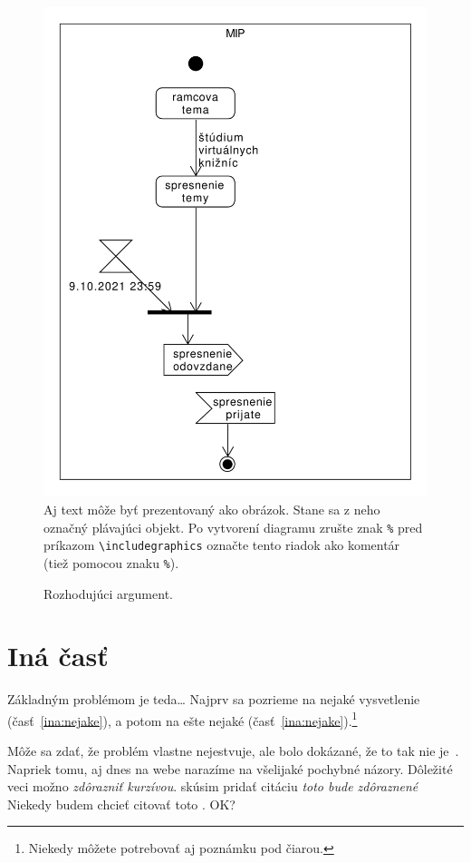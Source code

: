 \documentclass[10pt,twoside,slovak,a4paper]{article}
\begin{document}
\begin{figure}[tbh]
\centering
\includegraphics[scale=1.0]{diagram.pdf}
Aj text môže byť prezentovaný ako obrázok. Stane sa z neho označný plávajúci objekt. Po vytvorení diagramu zrušte znak \texttt{\%} pred príkazom \verb|\includegraphics| označte tento riadok ako komentár (tiež pomocou znaku \texttt{\%}).
\caption{Rozhodujúci argument.}
\label{f:rozhod}
\end{figure}



\section{Iná časť} \label{ina}

Základným problémom je teda\ldots{} Najprv sa pozrieme na nejaké vysvetlenie (časť~\ref{ina:nejake}), a potom na ešte nejaké (časť~\ref{ina:nejake}).\footnote{Niekedy môžete potrebovať aj poznámku pod čiarou.}

Môže sa zdať, že problém vlastne nejestvuje\cite{Coplien:MPD}, ale bolo dokázané, že to tak nie je~\cite{Czarnecki:Staged, Czarnecki:Progress}. Napriek tomu, aj dnes na webe narazíme na všelijaké pochybné názory\cite{PLP-Framework}. Dôležité veci možno \emph{zdôrazniť kurzívou}.
\cite{Osman:RE} skúsim pridať citáciu \emph{toto bude zdôraznené}
Niekedy budem chcieť citovať toto \cite{Osama:Adoption}. OK?
\end{document}
